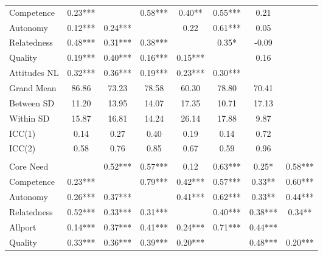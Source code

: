 \begin{table}
\begin{minipage}[t][\textheight][t]{\textwidth}
{\begin{tabular}[t]{lccccccc}
\hspace{1em}Competence & 0.23*** &  & 0.58*** & 0.40** & 0.55*** & 0.21 & \\
\hspace{1em}Autonomy & 0.12*** & 0.24*** &  & 0.22 & 0.61*** & 0.05 & \\
\hspace{1em}Relatedness & 0.48*** & 0.31*** & 0.38*** &  & 0.35* & -0.09 & \\
\hspace{1em}Quality & 0.19*** & 0.40*** & 0.16*** & 0.15*** &  & 0.16 & \\
\hspace{1em}Attitudes NL & 0.32*** & 0.36*** & 0.19*** & 0.23*** & 0.30*** &  & \\
\addlinespace
\hspace{1em}Grand Mean & 86.86 & 73.23 & 78.58 & 60.30 & 78.80 & 70.41 & \\
\hspace{1em}Between SD & 11.20 & 13.95 & 14.07 & 17.35 & 10.71 & 17.13 & \\
\hspace{1em}Within SD & 15.87 & 16.81 & 14.24 & 26.14 & 17.88 & 9.87 & \\
\hspace{1em}ICC(1) & 0.14 & 0.27 & 0.40 & 0.19 & 0.14 & 0.72 & \\
\hspace{1em}ICC(2) & 0.58 & 0.76 & 0.85 & 0.67 & 0.59 & 0.96 & \\
\addlinespace[0.3em]
\multicolumn{8}{l}{\textbf{Study 3}}\\
\hspace{1em}Core Need &  & 0.52*** & 0.57*** & 0.12 & 0.63*** & 0.25* & 0.58***\\
\hspace{1em}Competence & 0.23*** &  & 0.79*** & 0.42*** & 0.57*** & 0.33** & 0.60***\\
\hspace{1em}Autonomy & 0.26*** & 0.37*** &  & 0.41*** & 0.62*** & 0.33** & 0.44***\\
\hspace{1em}Relatedness & 0.52*** & 0.33*** & 0.31*** &  & 0.40*** & 0.38*** & 0.34**\\
\hspace{1em}Allport & 0.14*** & 0.37*** & 0.41*** & 0.24*** & 0.71*** & 0.44*** & \\
\hspace{1em}Quality & 0.33*** & 0.36*** & 0.39*** & 0.20*** &  & 0.48*** & 0.20***\\

\end{tabular}}
\end{minipage}
\end{table}
